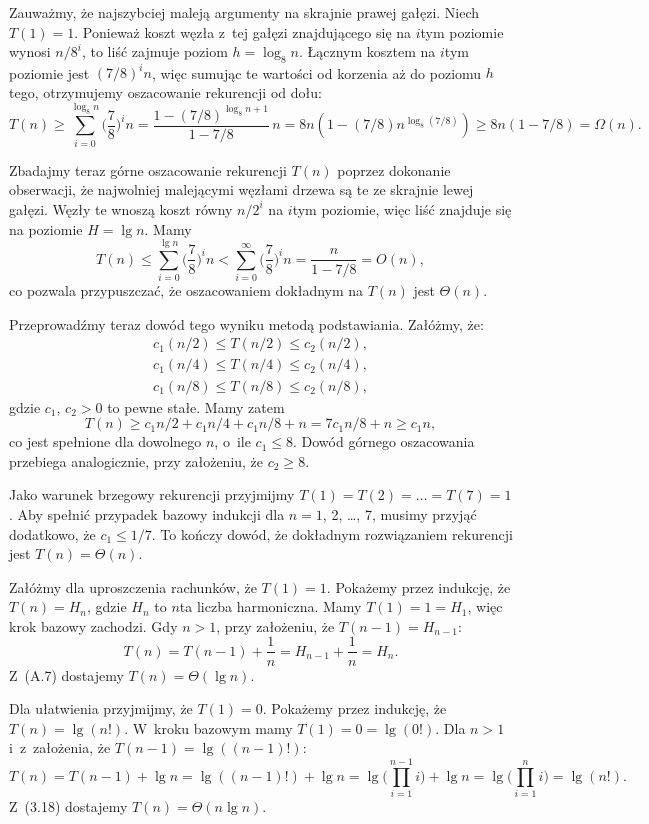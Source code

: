 Zauważmy, że najszybciej maleją argumenty na skrajnie prawej gałęzi.
Niech $T(1)=1$.
Ponieważ koszt węzła z~tej gałęzi znajdującego się na $i$\nbhyphen tym poziomie wynosi $n/8^i$, to liść zajmuje poziom $h=\log_8n$.
Łącznym kosztem na $i$\nbhyphen tym poziomie jest $(7/8)^in$, więc sumując te wartości od korzenia aż do poziomu $h$\nbhyphen tego, otrzymujemy oszacowanie rekurencji od dołu:
\[
	T(n) \ge \sum_{i=0}^{\log_8n}\biggl(\frac{7}{8}\biggr)^in = \frac{1-(7/8)^{\log_8n+1}}{1-7/8}\,n = 8n(1-(7/8)n^{\log_8(7/8)}) \ge 8n(1-7/8) = \Omega(n).
\]

Zbadajmy teraz górne oszacowanie rekurencji $T(n)$ poprzez dokonanie obserwacji, że najwolniej malejącymi węzłami drzewa są te ze skrajnie lewej gałęzi.
Węzły te wnoszą koszt równy $n/2^i$ na $i$\nbhyphen tym poziomie, więc liść znajduje się na poziomie $H=\lg n$.
Mamy
\[
	T(n) \le \sum_{i=0}^{\lg n}\biggl(\frac{7}{8}\biggr)^in < \sum_{i=0}^\infty\biggl(\frac{7}{8}\biggr)^in = \frac{n}{1-7/8} = O(n),
\]
co pozwala przypuszczać, że oszacowaniem dokładnym na $T(n)$ jest $\Theta(n)$.

Przeprowadźmy teraz dowód tego wyniku metodą podstawiania.
Załóżmy, że:
\begin{gather*}
	c_1(n/2) \le T(n/2) \le c_2(n/2), \\
	c_1(n/4) \le T(n/4) \le c_2(n/4), \\
	c_1(n/8) \le T(n/8) \le c_2(n/8),
\end{gather*}
gdzie $c_1$, $c_2>0$ to pewne stałe.
Mamy zatem
\[
	T(n) \ge c_1n/2+c_1n/4+c_1n/8+n = 7c_1n/8+n \ge c_1n,
\]
co jest spełnione dla dowolnego $n$, o~ile $c_1\le8$.
Dowód górnego oszacowania przebiega analogicznie, przy założeniu, że $c_2\ge8$.

Jako warunek brzegowy rekurencji przyjmijmy $T(1)=T(2)=\dots=T(7)=1$.
Aby spełnić przypadek bazowy indukcji dla $n=1$, 2, \dots, 7, musimy przyjąć dodatkowo, że $c_1\le1/7$.
To kończy dowód, że dokładnym rozwiązaniem rekurencji jest $T(n)=\Theta(n)$.

\subproblem %
Załóżmy dla uproszczenia rachunków, że $T(1)=1$.
Pokażemy przez indukcję, że $T(n)=H_n$, gdzie $H_n$ to $n$\nbhyphen ta liczba harmoniczna.
Mamy $T(1)=1=H_1$, więc krok bazowy zachodzi.
Gdy $n>1$, przy założeniu, że $T(n-1)=H_{n-1}$:
\[
	T(n) = T(n-1)+\frac{1}{n} = H_{n-1}+\frac{1}{n} = H_n.
\]
Z~(A.7) dostajemy $T(n)=\Theta(\lg n)$.

\subproblem %
Dla ułatwienia przyjmijmy, że $T(1)=0$.
Pokażemy przez indukcję, że $T(n)=\lg(n!)$.
W~kroku bazowym mamy $T(1)=0=\lg(0!)$.
Dla $n>1$ i~z~założenia, że $T(n-1)=\lg((n-1)!)$:
\[
	T(n) = T(n-1)+\lg n = \lg((n-1)!)+\lg n = \lg\biggl(\prod_{i=1}^{n-1}i\biggr)+\lg n = \lg\biggl(\prod_{i=1}^ni\biggr) = \lg(n!).
\]
Z~(3.18) dostajemy $T(n)=\Theta(n\lg n)$.

